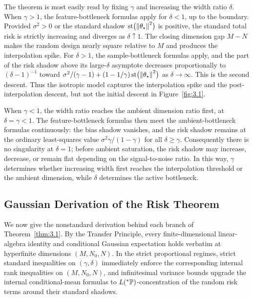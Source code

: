 The theorem is most easily read by fixing $\gamma$ and increasing the width ratio $\delta$. When $\gamma > 1$, the feature-bottleneck formulas apply for $\delta < 1$, up to the boundary. Provided $\sigma^2 > 0$ or the standard shadow $\operatorname{st}\bigl(\left\lVert \theta_\star \right\rVert^2\bigr)$ is positive, the standard total risk is strictly increasing and diverges as $\delta \uparrow 1$. The closing dimension gap $M - N$ makes the random design nearly square relative to $M$ and produces the interpolation spike. For $\delta > 1$, the sample-bottleneck formulas apply, and the part of the risk shadow above its large-$\delta$ asymptote decreases proportionally to $(\delta - 1)^{-1}$ toward $\sigma^2/(\gamma - 1) + (1 - 1/\gamma)\operatorname{st}\bigl(\left\lVert \theta_\star \right\rVert^2\bigr)$ as $\delta \to \infty$. This is the second descent. Thus the isotropic model captures the interpolation spike and the post-interpolation descent, but not the initial descent in Figure~\ref{fig:3.1}.

When $\gamma < 1$, the width ratio reaches the ambient dimension ratio first, at $\delta = \gamma < 1$. The feature-bottleneck formulas then meet the ambient-bottleneck formulas continuously: the bias shadow vanishes, and the risk shadow remains at the ordinary least-squares value $\sigma^2\gamma/(1 - \gamma)$ for all $\delta \ge \gamma$. Consequently there is no singularity at $\delta = 1$; before ambient saturation, the risk shadow may increase, decrease, or remain flat depending on the signal-to-noise ratio. In this way, $\gamma$ determines whether increasing width first reaches the interpolation threshold or the ambient dimension, while $\delta$ determines the active bottleneck.

\subsection{Gaussian Derivation of the Risk Theorem}
\label{sec:3.3.1}

We now give the nonstandard derivation behind each branch of Theorem~\ref{thm:3.1}. By the Transfer Principle, every finite-dimensional linear-algebra identity and conditional Gaussian expectation holds verbatim at hyperfinite dimensions $(M, N_0, N)$. In the strict proportional regimes, strict standard inequalities on $(\gamma, \delta)$ immediately enforce the corresponding internal rank inequalities on $(M, N_0, N)$, and infinitesimal variance bounds upgrade the internal conditional-mean formulas to $L({}^*\mathbb{P})$-concentration of the random risk terms around their standard shadows.


